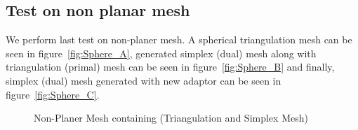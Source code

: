 \documentclass{InsightArticle}
\begin{document}
\subsection{Test on non planar mesh}
We perform last test on non-planer mesh. A spherical triangulation mesh can be seen in figure~\ref{fig:Sphere_A}, generated simplex (dual) mesh along with triangulation (primal) mesh can be seen in figure~\ref{fig:Sphere_B} and finally, simplex (dual) mesh generated with new adaptor can be seen in figure~\ref{fig:Sphere_C}. \\
\begin{figure}[!b]
	\centering
	\caption{Non-Planer Mesh containing (Triangulation and  Simplex Mesh)}
\label{fig:nonplanerTriangulationToSimplexMesh}
\end{figure}
\end{document}
